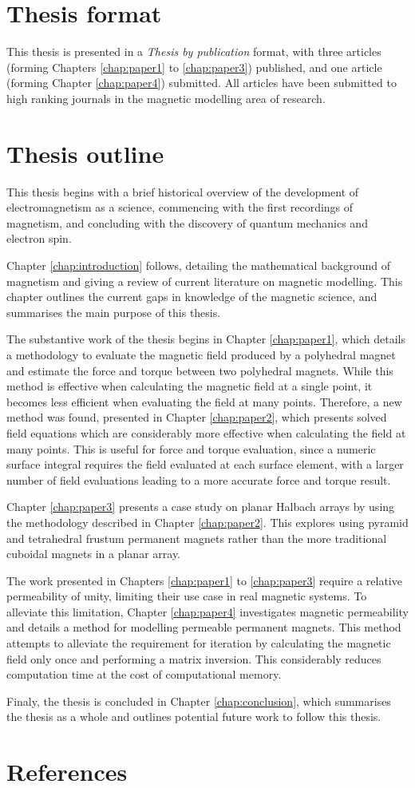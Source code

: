 \section{Thesis format}
This thesis is presented in a \textit{Thesis by publication} format, with three articles (forming Chapters \ref{chap:paper1} to \ref{chap:paper3}) published, and one article (forming Chapter \ref{chap:paper4}) submitted. All articles have been submitted to high ranking journals in the magnetic modelling area of research.

\section{Thesis outline}
This thesis begins with a brief historical overview of the development of electromagnetism as a science, commencing with the first recordings of magnetism, and concluding with the discovery of quantum mechanics and electron spin.

Chapter \ref{chap:introduction} follows, detailing the mathematical background of magnetism and giving a review of current literature on magnetic modelling. This chapter outlines the current gaps in knowledge of the magnetic science, and summarises the main purpose of this thesis.

The substantive work of the thesis begins in Chapter \ref{chap:paper1}, which details a methodology to evaluate the magnetic field produced by a polyhedral magnet and estimate the force and torque between two polyhedral magnets. While this method is effective when calculating the magnetic field at a single point, it becomes less efficient when evaluating the field at many points. Therefore, a new method was found, presented in Chapter \ref{chap:paper2}, which presents solved field equations which are considerably more effective when calculating the field at many points. This is useful for force and torque evaluation, since a numeric surface integral requires the field evaluated at each surface element, with a larger number of field evaluations leading to a more accurate force and torque result.

Chapter \ref{chap:paper3} presents a case study on planar Halbach arrays by using the methodology described in Chapter \ref{chap:paper2}. This explores using pyramid and tetrahedral frustum permanent magnets rather than the more traditional cuboidal magnets in a planar array.

The work presented in Chapters \ref{chap:paper1} to \ref{chap:paper3} require a relative permeability of unity, limiting their use case in real magnetic systems. To alleviate this limitation, Chapter \ref{chap:paper4} investigates magnetic permeability and details a method for modelling permeable permanent magnets. This method attempts to alleviate the requirement for iteration by calculating the magnetic field only once and performing a matrix inversion. This considerably reduces computation time at the cost of computational memory.

Finaly, the thesis is concluded in Chapter \ref{chap:conclusion}, which summarises the thesis as a whole and outlines potential future work to follow this thesis.
\newpage
\section*{References}
\printbibliography[heading=none]